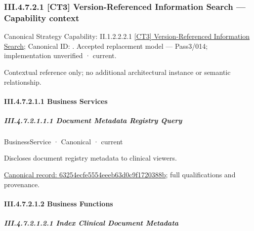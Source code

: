 \subsubsection*{III.4.7.2.1 [CT3] Version-Referenced Information Search — Capability context}
\label{navigation:III.4.7.2.1}

{\small Canonical Strategy Capability: II.1.2.2.2.1 \hyperref[element:1fb53b4061d04732822c496602c9df6c]{[CT3] Version-Referenced Information Search}; Canonical ID: \texttt{}. Accepted replacement model — Pass3/014; implementation unverified · current.}\par
Contextual reference only; no additional architectural instance or semantic relationship.\par
\paragraph*{III.4.7.2.1.1 Business Services}
\label{navigation:III.4.7.2.1.1}

\subparagraph*{III.4.7.2.1.1.1 Document Metadata Registry Query}
\label{navigation:III.4.7.2.1.1.1}

\label{element:63254ecfe5554eeeb63d0c9f1720388b}
{\small BusinessService · Canonical · current}\par

Discloses document registry metadata to clinical viewers.


{\footnotesize \href{../../../../../../../../continuum/business/business-service/63254ecfe5554eeeb63d0c9f1720388b.md}{Canonical record: 63254ecfe5554eeeb63d0c9f1720388b}; full qualifications and provenance.}\par
\paragraph*{III.4.7.2.1.2 Business Functions}
\label{navigation:III.4.7.2.1.2}

\subparagraph*{III.4.7.2.1.2.1 Index Clinical Document Metadata}
\label{navigation:III.4.7.2.1.2.1}

